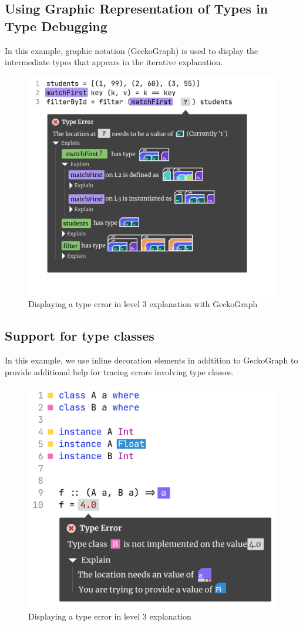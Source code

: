 \subsection{Using Graphic Representation of Types in Type Debugging}

In this example, graphic notation (GeckoGraph) is used to display the intermediate types that appears in the iterative explanation. 

\begin{figure}[hbt]
    \includegraphics[width=\linewidth]{Debugging-3-Gecko}
    \caption{
        Displaying a type error in level 3 explanation with GeckoGraph
      }
  \end{figure}


\subsection{Support for type classes}

  In this example, we use inline decoration elements in addtition to GeckoGraph to provide additional help for tracing errors involving type classes.  

  \begin{figure}[hbt]
    \includegraphics[width=\linewidth]{TypeClass}
    \caption{
        Displaying a type error in level 3 explanation
      }
  \end{figure}
